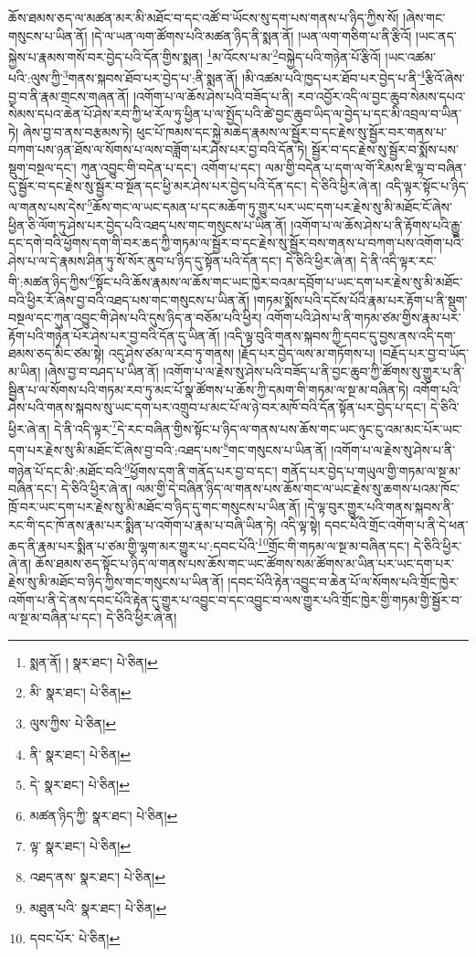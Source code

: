 ཆོས་ཐམས་ཅད་ལ་མཚན་མར་མི་མཐོང་བ་དང་འཚོ་བ་ཡོངས་སུ་དག་པས་གནས་པ་ཉིད་ཀྱིས་སོ། །ཞེས་གང་གསུངས་པ་ཡིན་ནོ། །དེ་ལ་ཡན་ལག་ཚོགས་པའི་མཚན་ཉིད་ནི་སྨན་ནོ། །ཡན་ལག་གཅིག་པ་ནི་རྩིའོ། །ཡང་ནད་སྐྱེས་པ་རྣམས་གསོ་བར་བྱེད་པའི་དོན་གྱིས་སྨན། \footnote{སྨན་ནོ། །   སྣར་ཐང་།  པེ་ཅིན། }མ་འོངས་པ་མ་\footnote{མི་  སྣར་ཐང་།  པེ་ཅིན། }བསྐྱེད་པའི་གཉེན་པོ་རྩིའོ། །ཡང་འཚམ་པའི་:ལུས་ཀྱི་\footnote{ལུས་ཀྱིས་  པེ་ཅིན། }གནས་སྐབས་ཐོབ་པར་བྱེད་པ་:ནི་སྨན་ནོ། །མི་འཚམ་པའི་ཁྱད་པར་ཐོབ་པར་བྱེད་པ་ནི་\footnote{ནི་  སྣར་ཐང་།  པེ་ཅིན། }རྩིའོ་ཞེས་བྱ་བ་ནི་རྣམ་གྲངས་གཞན་ནོ། །འགོག་པ་ལ་ཆོས་ཤེས་པའི་བཟོད་པ་ནི། རབ་འབྱོར་འདི་ལ་བྱང་ཆུབ་སེམས་དཔའ་སེམས་དཔའ་ཆེན་པོ་ཤེས་རབ་ཀྱི་ཕ་རོལ་ཏུ་ཕྱིན་པ་ལ་སྤྱོད་པའི་ཚེ་བྱང་ཆུབ་ཡིད་ལ་བྱེད་པ་དང་མི་འབྲལ་བ་ཡིན་ཏེ། ཞེས་བྱ་བ་ནས་བརྩམས་ཏེ། ཕུང་པོ་ཁམས་དང་སྐྱེ་མཆེད་རྣམས་ལ་སྦྱོར་བ་དང་རྗེས་སུ་སྦྱོར་བར་གནས་པ་བཀག་པས་ཉན་ཐོས་ལ་སོགས་པ་ལས་བཟློག་པར་ཤེས་པར་བྱ་བའི་དོན་ཏེ། སྦྱོར་བ་དང་རྗེས་སུ་སྦྱོར་བ་སྨོས་པས་སྡུག་བསྔལ་དང་། ཀུན་འབྱུང་གི་བདེན་པ་དང་། འགོག་པ་དང་། ལམ་གྱི་བདེན་པ་དག་ལ་གོ་རིམས་ཇི་ལྟ་བ་བཞིན་དུ་སྦྱོར་བ་དང་རྗེས་སུ་སྦྱོར་བ་སྔོན་དང་ཕྱི་མར་ཤེས་པར་བྱེད་པའི་དོན་དང་། དེ་ཅིའི་ཕྱིར་ཞེ་ན། འདི་ལྟར་སྟོང་པ་ཉིད་ལ་གནས་པས་དེས་\footnote{དེ་  སྣར་ཐང་།  པེ་ཅིན། }ཆོས་གང་ལ་ཡང་དམན་པ་དང་མཆོག་ཏུ་གྱུར་པར་ཡང་དག་པར་རྗེས་སུ་མི་མཐོང་ངོ་ཞེས་ཕྱིན་ཅི་ལོག་ཏུ་ཤེས་པར་བྱེད་པའི་འཐད་པས་གང་གསུངས་པ་ཡིན་ནོ། །འགོག་པ་ལ་ཆོས་ཤེས་པ་ནི་རྟོགས་པའི་རྒྱུ་དང་དགེ་བའི་ཕྱོགས་དག་གི་བར་ཆད་ཀྱི་གཏམ་ལ་སྦྱོར་བ་དང་རྗེས་སུ་སྦྱོར་བས་གནས་པ་བཀག་པས་འགོག་པའི་ཤེས་པ་ལ་དེ་རྣམས་ཤིན་ཏུ་སོ་སོར་ནུབ་པ་ཉིད་དུ་སྟོན་པའི་དོན་དང་། དེ་ཅིའི་ཕྱིར་ཞེ་ན། དེ་ནི་འདི་ལྟར་རང་གི་:མཚན་ཉིད་ཀྱིས་\footnote{མཚན་ཉིད་ཀྱི་  སྣར་ཐང་།  པེ་ཅིན། }སྟོང་པའི་ཆོས་རྣམས་ལ་ཆོས་གང་ཡང་ཁྱེར་བའམ་དབྲོག་པ་ཡང་དག་པར་རྗེས་སུ་མི་མཐོང་བའི་ཕྱིར་རོ་ཞེས་བྱ་བའི་འཐད་པས་གང་གསུངས་པ་ཡིན་ནོ། །གཏམ་སྨོས་པའི་དངོས་པོའི་རྣམ་པར་རྟོག་པ་ནི་སྡུག་བསྔལ་དང་ཀུན་འབྱུང་གི་ཤེས་པའི་དུས་ཉིད་ན་བཅོམ་པའི་ཕྱིར། འགོག་པའི་ཤེས་པ་ནི་གཏམ་ཙམ་གྱིས་རྣམ་པར་རྟོག་པའི་གཉེན་པོར་ཤེས་པར་བྱ་བའི་དོན་དུ་ཡིན་ནོ། །འདི་ལྟ་བུའི་གནས་སྐབས་ཀྱི་དབང་དུ་བྱས་ནས་འདི་དག་ཐམས་ཅད་མིང་ཙམ་སྟེ། འདུ་ཤེས་ཙམ་ལ་རབ་ཏུ་གནས། །རྗོད་པར་བྱེད་ལས་མ་གཏོགས་པ། །བརྗོད་པར་བྱ་བ་ཡོད་མ་ཡིན། །ཞེས་བྱ་བ་བཤད་པ་ཡིན་ནོ། །འགོག་པ་ལ་རྗེས་སུ་ཤེས་པའི་བཟོད་པ་ནི་བྱང་ཆུབ་ཀྱི་ཚོགས་སུ་གྱུར་པ་ནི་སྦྱིན་པ་ལ་སོགས་པའི་གཏམ་རབ་ཏུ་མང་པོ་སྣ་ཚོགས་པ་ཆོས་ཀྱི་དམག་གི་གཏམ་ལ་སྔ་མ་བཞིན་ཏེ། འགོག་པའི་ཤེས་པའི་གནས་སྐབས་སུ་ཡང་དག་པར་འགྲུབ་པ་མང་པོ་ལ་ཉེ་བར་མཁོ་བའི་དོན་སྟོན་པར་བྱེད་པ་དང་། དེ་ཅིའི་ཕྱིར་ཞེ་ན། དེ་ནི་འདི་ལྟར་\footnote{ལྟ་  སྣར་ཐང་།  པེ་ཅིན། }དེ་རང་བཞིན་གྱིས་སྟོང་པ་ཉིད་ལ་གནས་པས་ཆོས་གང་ཡང་ཉུང་ངུ་འམ་མང་པོར་ཡང་དག་པར་རྗེས་སུ་མི་མཐོང་ངོ་ཞེས་བྱ་བའི་:འཐད་པས་\footnote{འཐད་ནས་  སྣར་ཐང་།  པེ་ཅིན། }གང་གསུངས་པ་ཡིན་ནོ། །འགོག་པ་ལ་རྗེས་སུ་ཤེས་པ་ནི་གཉེན་པོ་དང་མི་:མཐོང་བའི་\footnote{མཐུན་པའི་  སྣར་ཐང་།  པེ་ཅིན། }ཕྱོགས་དག་ནི་གནོད་པར་བྱ་བ་དང་། གནོད་པར་བྱེད་པ་གཡུལ་གྱི་གཏམ་ལ་སྔ་མ་བཞིན་དང་། དེ་ཅིའི་ཕྱིར་ཞེ་ན། ལམ་གྱི་དེ་བཞིན་ཉིད་ལ་གནས་པས་ཆོས་གང་ལ་ཡང་རྗེས་སུ་ཆགས་པའམ་ཁོང་ཁྲོ་བར་ཡང་དག་པར་རྗེས་སུ་མི་མཐོང་བ་ཉིད་དུ་གང་གསུངས་པ་ཡིན་ནོ། །དེ་ལྟ་བུར་གྱུར་པའི་གནས་སྐབས་ནི་རང་གི་དང་ཁོ་ནས་རྣམ་པར་སྨིན་པ་འགོག་པ་རྣམ་པ་བཞི་ཡིན་ཏེ། འདི་ལྟ་སྟེ། དབང་པོའི་གྲོང་འགོག་པ་ནི་དེ་ཕན་ཆད་ནི་རྣམ་པར་སྨིན་པ་ཙམ་གྱི་ལྷག་མར་གྱུར་པ་:དབང་པོའི་\footnote{དབང་པོར་  པེ་ཅིན། }གྲོང་གི་གཏམ་ལ་སྔ་མ་བཞིན་དང་། དེ་ཅིའི་ཕྱིར་ཞེ་ན། ཆོས་ཐམས་ཅད་སྟོང་པ་ཉིད་ལ་གནས་པས་ཆོས་གང་ཡང་ཚོགས་སམ་ཚོགས་མ་ཡིན་པར་ཡང་དག་པར་རྗེས་སུ་མི་མཐོང་བ་ཉིད་ཀྱིས་གང་གསུངས་པ་ཡིན་ནོ། །དབང་པོའི་རྟེན་འབྱུང་བ་ཆེན་པོ་ལ་སོགས་པའི་གྲོང་ཁྱེར་འགོག་པ་ནི་དེ་ནས་དབང་པོའི་རྟེན་དུ་གྱུར་པ་འབྱུང་བ་དང་འབྱུང་བ་ལས་གྱུར་པའི་གྲོང་ཁྱེར་གྱི་གཏམ་གྱི་སྦྱོར་བ་ལ་སྔ་མ་བཞིན་པ་དང་། དེ་ཅིའི་ཕྱིར་ཞེ་ན། 